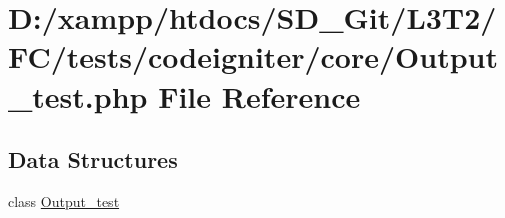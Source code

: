 \hypertarget{_output__test_8php}{}\section{D\+:/xampp/htdocs/\+S\+D\+\_\+\+Git/\+L3\+T2/\+F\+C/tests/codeigniter/core/\+Output\+\_\+test.php File Reference}
\label{_output__test_8php}
\subsection*{Data Structures}
\begin{DoxyCompactItemize}
\item 
class \hyperlink{class_output__test}{Output\+\_\+test}
\end{DoxyCompactItemize}
